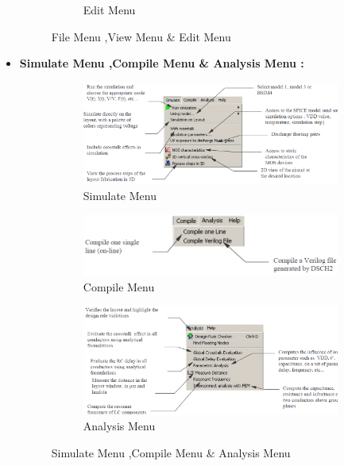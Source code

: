 \documentclass[a4paper,12pt]{article}
\begin{document}
\begin{itemize}
\begin{figure}[H]
\begin{subfigure}[t]{0.49\textwidth}
				\caption{Edit Menu}
				\label{fig:3-c}
			\end{subfigure}
			\caption{File Menu ,View Menu \& Edit Menu}
		\end{figure}
		
		\newpage
		\item \textbf{Simulate Menu ,Compile Menu \& Analysis Menu :}
		\begin{figure}[H]
			\centering
			\begin{subfigure}[t]{0.5\textwidth}
				\centering
				\includegraphics[width=1\textwidth , height=.17\textheight]{Images/microwind/simulatemenu.png}
				\caption{Simulate Menu}
				\label{fig:4-a}
			\end{subfigure}
			\hfill
			\begin{subfigure}[t]{0.49\textwidth}
				\centering
				\includegraphics[width=1\textwidth ]{Images/microwind/compilemenu.png}
				\caption{Compile Menu}
				\label{fig:4-b}
			\end{subfigure}
			\begin{subfigure}[t]{0.6\textwidth}
				\centering
				\includegraphics[width=1\textwidth , height=.21\textheight]{Images/microwind/analysismenu2.png}
				\caption{Analysis Menu}
				\label{fig:4-c}
			\end{subfigure}
			\caption{Simulate Menu ,Compile Menu \& Analysis Menu}
			
		\end{figure}
		
	\end{itemize}
\end{document}
